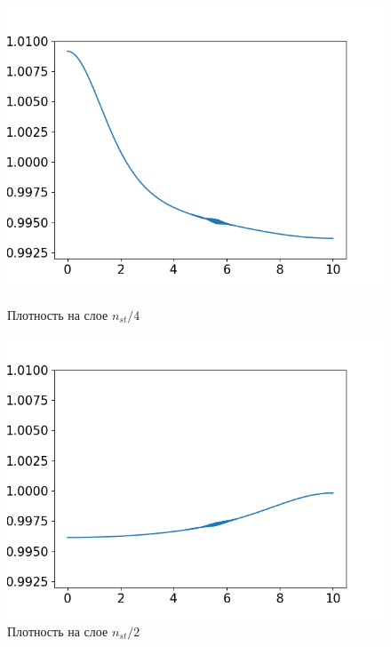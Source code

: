 \begin{figure}[h]
	\begin{minipage}[h]{0.47\linewidth}
		\centering
		\includegraphics[width=1\linewidth]{pics/task2/14h_2.png} 
		\caption{Плотность на слое $n_{st} / 4$}
	\end{minipage}
	\hfill
	\begin{minipage}[h]{0.47\linewidth}
		\centering
		\includegraphics[width=1\linewidth]{pics/task2/24h_2.png} 
		\caption{Плотность на слое $n_{st} / 2$}
	\end{minipage}
	\vfill
	\begin{minipage}[h]{0.47\linewidth}
		\centering

\end{minipage}
\end{figure}
